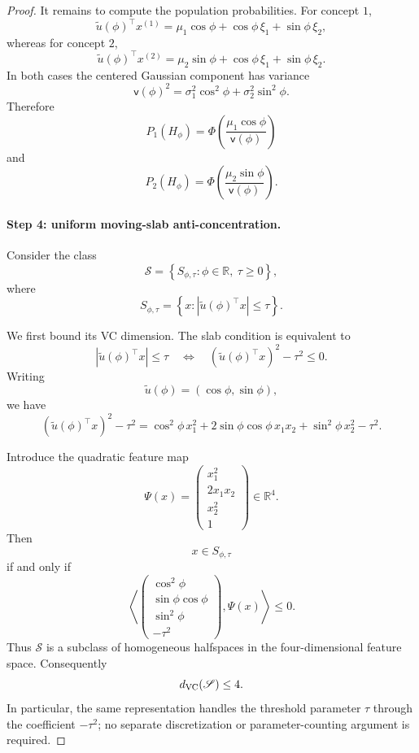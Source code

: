 \documentclass{article} %
\theoremstyle{plain}
\theoremstyle{definition}
\theoremstyle{remark}
\begin{document}
\begin{proof}
It remains to compute the population probabilities. For concept $1$,
\[
\widetilde u(\phi)^\top x^{(1)}
=
\mu_1\cos\phi
+
\cos\phi\,\xi_1
+
\sin\phi\,\xi_2,
\]
whereas for concept $2$,
\[
\widetilde u(\phi)^\top x^{(2)}
=
\mu_2\sin\phi
+
\cos\phi\,\xi_1
+
\sin\phi\,\xi_2.
\]
In both cases the centered Gaussian component has variance
\[
\mathsf v(\phi)^2
=
\sigma_1^2\cos^2\phi
+
\sigma_2^2\sin^2\phi.
\]
Therefore
\[
P_1(H_\phi)
=
\Phi\!\left(
\frac{\mu_1\cos\phi}{\mathsf v(\phi)}
\right)
\]
and
\[
P_2(H_\phi)
=
\Phi\!\left(
\frac{\mu_2\sin\phi}{\mathsf v(\phi)}
\right).
\]

\paragraph{Step 4: uniform moving-slab anti-concentration.}

Consider the class
\[
\mathscr S
=
\left\{
S_{\phi,\tau}:
\phi\in\mathbb R,\ \tau\ge0
\right\},
\]
where
\[
S_{\phi,\tau}
=
\left\{
x:
|\widetilde u(\phi)^\top x|
\le\tau
\right\}.
\]

We first bound its VC dimension. The slab condition is equivalent to
\[
|\widetilde u(\phi)^\top x|
\le\tau
\quad\Longleftrightarrow\quad
(\widetilde u(\phi)^\top x)^2-\tau^2\le0.
\]
Writing
\[
\widetilde u(\phi)
=
(\cos\phi,\sin\phi),
\]
we have
\[
(\widetilde u(\phi)^\top x)^2-\tau^2
=
\cos^2\phi\,x_1^2
+
2\sin\phi\cos\phi\,x_1x_2
+
\sin^2\phi\,x_2^2
-
\tau^2.
\]

Introduce the quadratic feature map
\[
\Psi(x)
=
\begin{pmatrix}
x_1^2\\
2x_1x_2\\
x_2^2\\
1
\end{pmatrix}
\in\mathbb R^4.
\]
Then
\[
x\in S_{\phi,\tau}
\]
if and only if
\[
\left\langle
\begin{pmatrix}
\cos^2\phi\\
\sin\phi\cos\phi\\
\sin^2\phi\\
-\tau^2
\end{pmatrix},
\Psi(x)
\right\rangle
\le0.
\]
Thus $\mathscr S$ is a subclass of homogeneous halfspaces in the
four-dimensional feature space. Consequently
\[
d_{\rm VC}(\mathscr S)\le4.
\]
In particular, the same representation handles the threshold parameter
$\tau$ through the coefficient $-\tau^2$; no separate discretization
or parameter-counting argument is required.


\end{proof}
\end{document}
